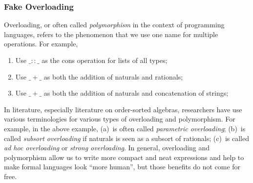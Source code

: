 \documentclass[UTF8,11pt]{article}
\theoremstyle{plain}
\theoremstyle{definition}
\theoremstyle{remark}
\newcommand{\doublecolon}{::}
\begin{document}
\subsubsection{Fake Overloading}
Overloading, or often called \emph{polymorphism} in the context of 
programming languages, refers to the 
phenomenon that we use one name for multiple operations.
For example,
\begin{enumerate}[label=(\alph*).]
	\item Use $\_\doublecolon\_$ as the cons operation for lists of all types;
	\item Use $\_+\_$ as both the addition of naturals and rationals;
	\item Use $\_+\_$ as both the addition of naturals and concatenation of 
	strings;
\end{enumerate}
In literature, especially literature on order-sorted algebras, researchers have 
use various terminologies for various types of overloading and polymorphism.
For example, in the above example, (a)~is often called \emph{parametric 
overloading}; (b)~is called \emph{subsort overloading} if naturals is seen 
as a subsort of rationals; (c)~is called \emph{ad hoc overloading} or 
\emph{strong overloading}.
In general, overloading and polymorphism allow us to write more compact and 
neat 
expressions and help to make formal languages look ``more human'', but those 
benefits do not come for free.
\end{document}
